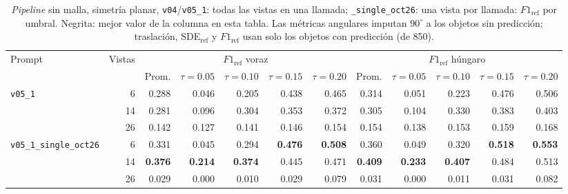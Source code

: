 \begin{table}[htbp]
\centering
\caption{\textit{Pipeline} sin malla, simetría planar, \texttt{v04}/\texttt{v05\_1}: todas las vistas en una llamada; \texttt{\_single\_oct26}: una vista por llamada: $F1_{\mathrm{ref}}$ por umbral. Negrita: mejor valor de la columna en esta tabla. Las métricas angulares imputan $90^\circ$ a los objetos sin predicción; traslación, SDE$_{\mathrm{ref}}$ y $F1_{\mathrm{ref}}$ usan solo los objetos con predicción (de 850).}
\label{tab:plane_modo_envio_f1}
\begin{adjustbox}{max width=\textwidth}
\begin{tabular}{lrrrrrrrrrrr}
\toprule
\multirow{2}{*}{Prompt} & \multirow{2}{*}{Vistas} & \multicolumn{5}{c}{$F1_{\mathrm{ref}}$ voraz} & \multicolumn{5}{c}{$F1_{\mathrm{ref}}$ húngaro} \\
\cmidrule(lr){3-7} \cmidrule(lr){8-12}
 &  & Prom. & $\tau{=}0.05$ & $\tau{=}0.10$ & $\tau{=}0.15$ & $\tau{=}0.20$ & Prom. & $\tau{=}0.05$ & $\tau{=}0.10$ & $\tau{=}0.15$ & $\tau{=}0.20$ \\
\midrule
\multirow{3}{*}{\texttt{v05\_1}} & 6 & 0.288 & 0.046 & 0.205 & 0.438 & 0.465 & 0.314 & 0.051 & 0.223 & 0.476 & 0.506 \\
 & 14 & 0.281 & 0.096 & 0.304 & 0.353 & 0.372 & 0.305 & 0.104 & 0.330 & 0.383 & 0.403 \\
 & 26 & 0.142 & 0.127 & 0.141 & 0.146 & 0.154 & 0.154 & 0.138 & 0.153 & 0.159 & 0.168 \\
\midrule
\multirow{3}{*}{\texttt{v05\_1\_single\_oct26}} & 6 & 0.331 & 0.045 & 0.294 & \textbf{0.476} & \textbf{0.508} & 0.360 & 0.049 & 0.320 & \textbf{0.518} & \textbf{0.553} \\
 & 14 & \textbf{0.376} & \textbf{0.214} & \textbf{0.374} & 0.445 & 0.471 & \textbf{0.409} & \textbf{0.233} & \textbf{0.407} & 0.484 & 0.513 \\
 & 26 & 0.029 & 0.000 & 0.010 & 0.029 & 0.079 & 0.031 & 0.000 & 0.011 & 0.031 & 0.082 \\
\bottomrule
\end{tabular}
\end{adjustbox}
\end{table}

